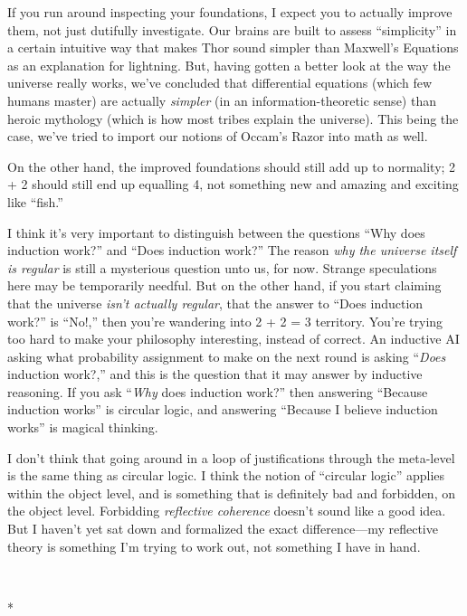 {
 If you run around inspecting your foundations, I expect you to
actually improve them, not just dutifully investigate. Our brains are
built to assess ``simplicity'' in a
certain intuitive way that makes Thor sound simpler than
Maxwell's Equations as an explanation for lightning.
But, having gotten a better look at the way the universe really works,
we've concluded that differential equations (which few
humans master) are actually \textit{simpler} (in an
information-theoretic sense) than heroic mythology (which is how most
tribes explain the universe). This being the case,
we've tried to import our notions of
Occam's Razor into math as well.}

{
 On the other hand, the improved foundations should still add up to
normality; 2 + 2 should still end up equalling 4, not something new and
amazing and exciting like ``fish.''}

{
 I think it's very important to distinguish between
the questions ``Why does induction
work?'' and ``Does induction
work?'' The reason \textit{why the universe itself is
regular} is still a mysterious question unto us, for now. Strange
speculations here may be temporarily needful. But on the other hand, if
you start claiming that the universe \textit{isn't
actually regular}, that the answer to ``Does induction
work?'' is
``No!,'' then you're
wandering into 2 + 2 = 3 territory. You're trying too
hard to make your philosophy interesting, instead of correct. An
inductive AI asking what probability assignment to make on the next
round is asking ``\textit{Does} induction
work?,'' and this is the question that it may answer
by inductive reasoning. If you ask ``\textit{Why} does
induction work?'' then answering
``Because induction works'' is
circular logic, and answering ``Because I believe
induction works'' is magical thinking.}

{
 I don't think that going around in a loop of
justifications through the meta-level is the same thing as circular
logic. I think the notion of ``circular
logic'' applies within the object level, and is
something that is definitely bad and forbidden, on the object level.
Forbidding \textit{reflective coherence} doesn't sound
like a good idea. But I haven't yet sat down and
formalized the exact difference---my reflective theory is something
I'm trying to work out, not something I have in hand.}

{\centering
 \ ~
\par}

{\centering
 *
\par}

